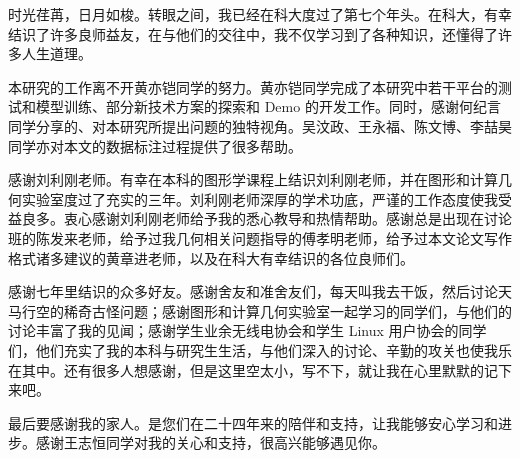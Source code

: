 
\begin{acknowledgements}

时光荏苒，日月如梭。转眼之间，我已经在科大度过了第七个年头。在科大，有幸结识了许多良师益友，在与他们的交往中，我不仅学习到了各种知识，还懂得了许多人生道理。

本研究的工作离不开黄亦铠同学的努力。黄亦铠同学完成了本研究中若干平台的测试和模型训练、部分新技术方案的探索和 Demo 的开发工作。同时，感谢何纪言同学分享的、对本研究所提出问题的独特视角。吴汶政、王永福、陈文博、李喆昊同学亦对本文的数据标注过程提供了很多帮助。

感谢刘利刚老师。有幸在本科的图形学课程上结识刘利刚老师，并在图形和计算几何实验室度过了充实的三年。刘利刚老师深厚的学术功底，严谨的工作态度使我受益良多。衷心感谢刘利刚老师给予我的悉心教导和热情帮助。感谢总是出现在讨论班的陈发来老师，给予过我几何相关问题指导的傅孝明老师，给予过本文论文写作格式诸多建议的黄章进老师，以及在科大有幸结识的各位良师们。

感谢七年里结识的众多好友。感谢舍友和准舍友们，每天叫我去干饭，然后讨论天马行空的稀奇古怪问题；感谢图形和计算几何实验室一起学习的同学们，与他们的讨论丰富了我的见闻；感谢学生业余无线电协会和学生 Linux 用户协会的同学们，他们充实了我的本科与研究生生活，与他们深入的讨论、辛勤的攻关也使我乐在其中。还有很多人想感谢，但是这里空太小，写不下，就让我在心里默默的记下来吧。

最后要感谢我的家人。是您们在二十四年来的陪伴和支持，让我能够安心学习和进步。感谢王志恒同学对我的关心和支持，很高兴能够遇见你。



\end{acknowledgements}
